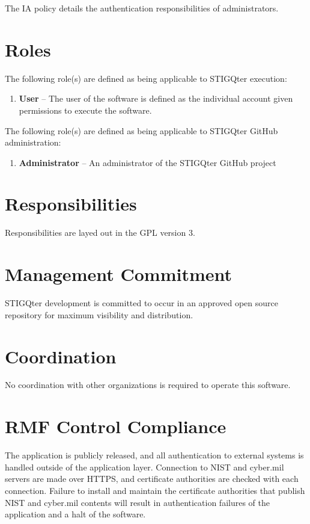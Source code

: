 \documentclass[letterpaper, 10pt, twoside]{article}
\begin{document}
The IA policy details the authentication responsibilities of administrators.

\section{Roles}
\label{sec:roles}

The following role(s) are defined as being applicable to STIGQter execution:
\begin{enumerate}
	\item \textbf{User} -- The user of the software is defined as the individual account given permissions to execute the software.
\end{enumerate}

The following role(s) are defined as being applicable to STIGQter GitHub administration:
\begin{enumerate}
	\item \textbf{Administrator} -- An administrator of the STIGQter GitHub project
\end{enumerate}

\section{Responsibilities}
\label{sec:responsibilities}

Responsibilities are layed out in the GPL version 3.

\section{Management Commitment}

STIGQter development is committed to occur in an approved open source repository for maximum visibility and distribution.

\section{Coordination}

No coordination with other organizations is required to operate this software.

\section{RMF Control Compliance}
\label{sec:compliance}

The application is publicly released, and all authentication to external systems is handled outside of the application layer. Connection to NIST and cyber.mil servers are made over HTTPS, and certificate authorities are checked with each connection. Failure to install and maintain the certificate authorities that publish NIST and cyber.mil contents will result in authentication failures of the application and a halt of the software.
\end{document}
